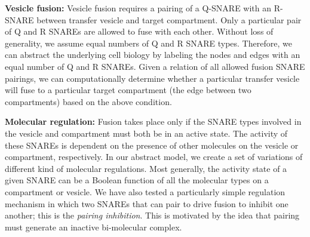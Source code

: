 \textbf{Vesicle fusion:}
%
% 
%
%  
%
%
Vesicle fusion requires a pairing of a Q-SNARE with an R-SNARE between transfer vesicle and target compartment. 
%
%
Only a particular pair of Q and R SNAREs are allowed to fuse with each other.
%
Without loss of generality, we assume equal numbers of Q and R SNARE types.
%
Therefore, we can abstract the underlying cell biology by labeling the nodes and edges with an equal number of Q and R SNAREs. 
%
%
Given a relation of all allowed fusion SNARE pairings, we can computationally determine whether a particular transfer vesicle will fuse to a particular target compartment (the edge between two compartments) based on the above condition.  

\textbf{Molecular regulation:} 
Fusion takes place only if the SNARE types involved in the vesicle and compartment must both be in an active state.
%
The activity of these SNAREs is dependent on the presence of other molecules on the vesicle or compartment, respectively.
%
In our abstract model, we create a set of variations of different kind of molecular regulations.
%
Most generally, the activity state of a given SNARE can be a Boolean function of all the molecular types on a compartment or vesicle. 
%
We have also tested \cite{shukla} a particularly simple regulation mechanism in which two SNAREs that can pair to drive fusion to inhibit one another; this is the \textit{pairing inhibition}. 
%
This is motivated by the idea that pairing must generate an inactive bi-molecular complex.
%

